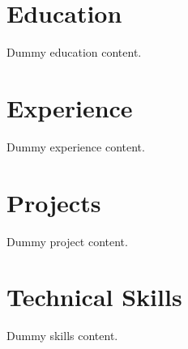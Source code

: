 \documentclass{article}
\begin{document}
\section{Education}
Dummy education content.
\section{Experience}
Dummy experience content.
\section{Projects}
Dummy project content.
\section{Technical Skills}
Dummy skills content.
\end{document}

